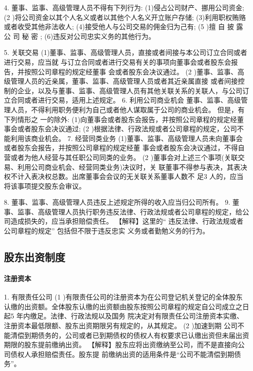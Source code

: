 \documentclass[UTF8,12pt]{ctexart}
\numberwithin{equation}{section} %
\numberwithin{figure}{section}
\numberwithin{table}{section}
\begin{document}
	4. 董事、监事、高级管理人员不得有下列行为:
	(1)侵占公司财产、挪用公司资金;
	(2 )将公司资金以其个人名义或者以其他个人名义开立账户存储; (3)利用职权贿赂或者收受其他非法收人;
	(4)接受他人与公司交易的佣金归为己有;
	(5 )擅 自 披 露 公 司 秘 密 ;
	(6)违反对公司忠实义务的其他行为。
	
	5. 关联交易 (1)董事、监事、高级管理人员，直接或者间接与本公司订立合同或者进行交易，应当就 与订立合同或者进行交易有关的事项向董事会或者股东会报告，并按照公司章程的规定经董事 会或者股东会决议通过。
	(2 )董事、监事、高级管理人员的近亲属，董事、监事、高级管理人员或者其近亲属直接 或者间接控制的企业，以及与董事、监事、高级管理人员有其他关联关系的关联人，与公司订 立合同或者进行交易，适用上述规定。
	6. 利用公司商业机会 董事、监事、高级管理人员，不得利用职务便利为自己或者他人谋取属于公司的商业机会。 但是，有下列情形之 一的除外: (1)向董事会或者股东会报告，并按照公司章程的规定经董事会或者股东会决议通过; (2 )根据法律、行政法规或者公司章程的规定，公司不能利用该商业机会。
	7. 经营同类业务 (1)董事、监事、高级管理人员未向董事会或者股东会报告，并按照公司章程的规定经董 事会或者股东会决议通过，不得自营或者为他人经营与其任职公司同类的业务。
	(2 )董事会对上述三个事项(关联交易、利用公司商业机会、经营同类业务)决议时，关 联董事不得参与表决，其表决权不计入表决权总数。出席董事会会议的无关联关系董事人数不 足3 人的，应当将该事项提交股东会审议。
	
	8. 董事、监事、高级管理人员违反上述规定所得的收入应当归公司所有。
	9. 董事、监事、高级管理人员执行职务违反法律、行政法规或者公司章程的规定，给公 司造成损失的，应当承担赔偿责任。
	【解释】这里的“ 违反法律、行政法规或者公司章程的规定” 包括但不限于违反忠实 义务或者勤勉义务的行为。
	
	\subsection{股东出资制度}
	
	\paragraph{注册资本}
	1. 有限责任公司
	(1 )有限责任公司的注册资本为在公司登记机关登记的全体股东认缴的出资额。全体股东认缴的出资额由股东按照公司章程的规定自公司成立之日起5 年内缴足。法律、行政法规以及国务 院决定对有限责任公司注册资本实缴、注册资本最低限额、股东出资期限另有规定的，从其规定。 (2 )加速到期 公司不能清偿到期债务的，公司或者已到期债权的债权人有权要求已认缴出资但未届出资 期限的股东提前缴纳出资。
	【解释】股东应将出资缴纳至公司，而不是直接向公司债权人承担赔偿责任。股东提 前缴纳出资的适用条件是“公司不能清偿到期债务”。
	
\end{document}
